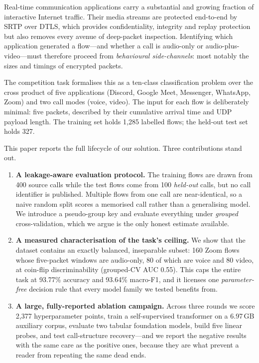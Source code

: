 \documentclass[11pt]{article}
\begin{document}
Real-time communication applications carry a substantial and growing fraction of interactive Internet
traffic. Their media streams are protected end-to-end by SRTP over DTLS, which provides confidentiality,
integrity and replay protection but also removes every avenue of deep-packet inspection. Identifying which
application generated a flow---and whether a call is audio-only or audio-plus-video---must therefore
proceed from \emph{behavioural side-channels}: most notably the sizes and timings of encrypted packets.

The competition task formalises this as a ten-class classification problem over the cross product of five
applications (Discord, Google Meet, Messenger, WhatsApp, Zoom) and two call modes (voice, video). The input
for each flow is deliberately minimal: five packets, described by their cumulative arrival time and UDP
payload length. The training set holds 1{,}285 labelled flows; the held-out test set holds 327.

This paper reports the full lifecycle of our solution. Three contributions stand out.

\begin{enumerate}
\item \textbf{A leakage-aware evaluation protocol.} The training flows are drawn from 400 source calls
while the test flows come from 100 \emph{held-out} calls, but no call identifier is published. Multiple
flows from one call are near-identical, so a naive random split scores a memorised call rather than a
generalising model. We introduce a pseudo-group key and evaluate everything under \emph{grouped}
cross-validation, which we argue is the only honest estimate available.
\item \textbf{A measured characterisation of the task's ceiling.} We show that the dataset contains an
exactly balanced, inseparable subset: 160 Zoom flows whose five-packet windows are audio-only, 80 of which
are voice and 80 video, at coin-flip discriminability (grouped-CV AUC 0.55). This caps the entire task at
93.77\% accuracy and 93.64\% macro-F1, and it licenses one \emph{parameter-free} decision rule that every
model family we tested benefits from.
\item \textbf{A large, fully-reported ablation campaign.} Across three rounds we score 2{,}377
hyperparameter points, train a self-supervised transformer on a 6.97\,GB auxiliary corpus, evaluate two
tabular foundation models, build five linear probes, and test call-structure recovery---and we report the
negative results with the same care as the positive ones, because they are what prevent a reader from
repeating the same dead ends.
\end{enumerate}
\end{document}
